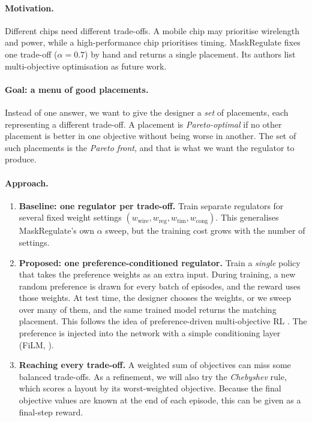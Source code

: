 \documentclass{article}
\begin{document}
\paragraph{Motivation.} Different chips need different trade-offs. A mobile chip may prioritise
wirelength and power, while a high-performance chip prioritises timing. MaskRegulate fixes one
trade-off ($\alpha=0.7$) by hand and returns a single placement. Its authors list multi-objective
optimisation as future work.

\paragraph{Goal: a menu of good placements.} Instead of one answer, we want to give the designer a
\emph{set} of placements, each representing a different trade-off. A placement is \emph{Pareto-optimal}
if no other placement is better in one objective without being worse in another. The set of such
placements is the \emph{Pareto front}, and that is what we want the regulator to produce.

\paragraph{Approach.}
\begin{enumerate}
  \item \textbf{Baseline: one regulator per trade-off.} Train separate regulators for several fixed
  weight settings $(w_{\mathrm{wire}},w_{\mathrm{reg}},w_{\mathrm{tim}},w_{\mathrm{cong}})$. This
  generalises MaskRegulate's own $\alpha$ sweep, but the training cost grows with the number of
  settings.
  \item \textbf{Proposed: one preference-conditioned regulator.} Train a \emph{single} policy that
  takes the preference weights as an extra input. During training, a new random preference is drawn
  for every batch of episodes, and the reward uses those weights. At test time, the designer chooses
  the weights, or we sweep over many of them, and the same trained model returns the matching
  placement. This follows the idea of preference-driven multi-objective RL \citep{basaklar2023pdmorl}.
  The preference is injected into the network with a simple conditioning layer (FiLM,
  \citealp{perez2018film}).
  \item \textbf{Reaching every trade-off.} A weighted sum of objectives can miss some balanced
  trade-offs. As a refinement, we will also try the \emph{Chebyshev} rule, which scores a layout by
  its worst-weighted objective. Because the final objective values are known at the end of each
  episode, this can be given as a final-step reward.
\end{enumerate}
\end{document}
